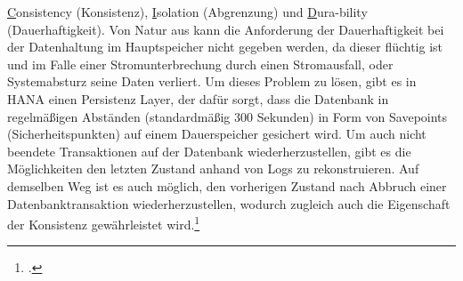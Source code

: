 \underline{C}onsistency (Konsistenz), \underline{I}solation (Abgrenzung) und \underline{D}ura-bility (Dauerhaftigkeit). Von Natur aus kann die Anforderung der Dauerhaftigkeit bei der Datenhaltung im Hauptspeicher nicht gegeben werden, da dieser flüchtig ist und im Falle einer Stromunterbrechung durch einen Stromausfall, oder Systemabsturz seine Daten verliert. Um dieses Problem zu lösen, gibt es in HANA einen \glqq{}Persistenz Layer\grqq{}, der dafür sorgt, dass die Datenbank in regelmäßigen Abständen (standardmäßig 300 Sekunden) in Form von \glqq{}Savepoints\grqq{} (Sicherheitspunkten) auf einem Dauerspeicher gesichert wird. Um auch nicht beendete Transaktionen auf der Datenbank wiederherzustellen, gibt es die Möglichkeiten den letzten Zustand anhand von Logs zu rekonstruieren. Auf demselben Weg ist es auch möglich, den vorherigen Zustand nach Abbruch einer Datenbanktransaktion wiederherzustellen, wodurch zugleich auch die Eigenschaft der Konsistenz gewährleistet wird.\footcite[Vgl.][]{rz10-acid}

